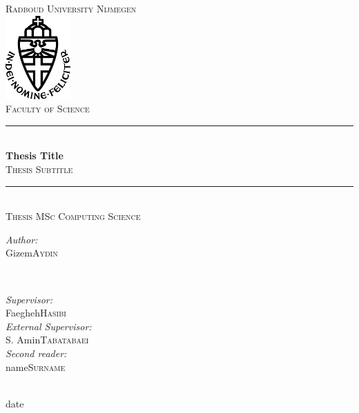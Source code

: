 \documentclass{article}
\title{\thesistitle}
\author{\thesisauthorfirst\space\thesisauthorsecond}
\date{\thesisdate}
\def\thesistitle{Thesis Title}
\def\thesissubtitle{Thesis Subtitle}
\def\thesisauthorfirst{Gizem}
\def\thesisauthorsecond{Aydin}
\def\thesissupervisorfirst{Faegheh}
\def\thesissupervisorsecond{Hasibi}
\def\extthesissupervisorfirst{S. Amin}
\def\extthesissupervisorsecond{Tabatabaei}
\def\thesissecondreaderfirst{name}
\def\thesissecondreadersecond{Surname}
\def\thesisdate{date}
\theoremstyle{definition}
\theoremstyle{remark}
\begin{document}
\begin{titlepage}
	\thispagestyle{empty}
	\newcommand{\HRule}{\rule{\linewidth}{0.5mm}}
	\center
	\textsc{\Large Radboud University Nijmegen}\\[.7cm]
	\includegraphics[width=25mm]{img/in_dei_nomine_feliciter.eps}\\[.5cm]
	\textsc{Faculty of Science}\\[0.5cm]
	
	\HRule \\[0.4cm]
	{ \huge \bfseries \thesistitle}\\[0.1cm]
	\textsc{\thesissubtitle}\\
	\HRule \\[.5cm]
	\textsc{\large Thesis MSc Computing Science}\\[.5cm]
	
	\begin{minipage}{0.4\textwidth}
	\begin{flushleft} \large
	\emph{Author:}\\
	\thesisauthorfirst\space \textsc{\thesisauthorsecond}
	\end{flushleft}
	\end{minipage}
	~
	\begin{minipage}{0.4\textwidth}
	\begin{flushright} \large
	\emph{Supervisor:} \\
	\thesissupervisorfirst\space \textsc{\thesissupervisorsecond} \\[1em]
	\emph{External Supervisor:} \\
	\extthesissupervisorfirst\space \textsc{\extthesissupervisorsecond} \\[1em]
	\emph{Second reader:} \\
	\thesissecondreaderfirst\space \textsc{\thesissecondreadersecond}
	\end{flushright}
	\end{minipage}\\[4cm]
	\vfill
	{\large \thesisdate}\\
	\clearpage
\end{titlepage}

\tableofcontents
\end{document}
